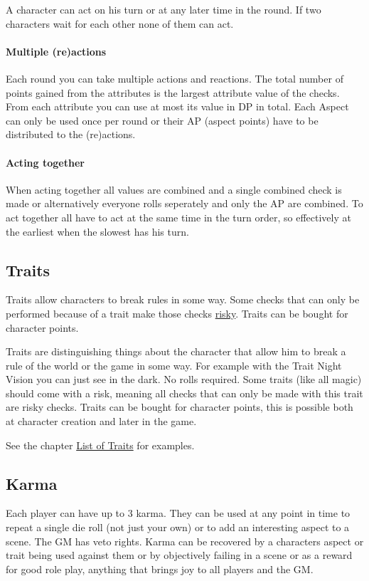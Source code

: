 \documentclass[11pt]{article}
\begin{document}
{A character can act on his turn or at any later time in the round. If two characters wait for each other none of them can act.
\paragraph*{Multiple (re)actions}
\label{sec:orgea30ec8}
Each round you can take multiple actions and reactions. The total number of points gained from the attributes is the largest attribute value of the checks. From each attribute you can use at most its value in DP in total. Each Aspect can only be used once per round or their AP (aspect points) have to be distributed to the (re)actions.
\paragraph*{Acting together}
\label{sec:orge4faa47}
When acting together all values are combined and a single combined check is made or alternatively everyone rolls seperately and only the AP are combined. To act together all have to act at the same time in the turn order, so effectively at the earliest when the slowest has his turn.
\subsection{Traits}
\label{sec:org3c5a6fa}
\begin{short}
Traits allow characters to break rules in some way. Some checks that can only be performed because of a trait make those checks \hyperref[sec:org8b0c4a4]{risky}. Traits can be bought for character points.
\end{short}

Traits are distinguishing things about the character that allow him to break a rule of the world or the game in some way. For example with the Trait Night Vision you can just see in the dark. No rolls required. Some traits (like all magic) should come with a risk, meaning all checks that can only be made with this trait are risky checks. Traits can be bought for character points, this is possible both at character creation and later in the game.

See the chapter \hyperref[sec:orgc8e3cb8]{List of Traits} for examples.
\subsection{Karma}
\label{sec:org08ffeba}
\begin{short}
Each player can have up to 3 karma. They can be used at any point in time to repeat a single die roll (not just your own) or to add an interesting aspect to a scene. The GM has veto rights. Karma can be recovered by a characters aspect or trait being used against them or by objectively failing in a scene or as a reward for good role play, anything that brings joy to all players and the GM. 
\end{short}
}
\end{document}
